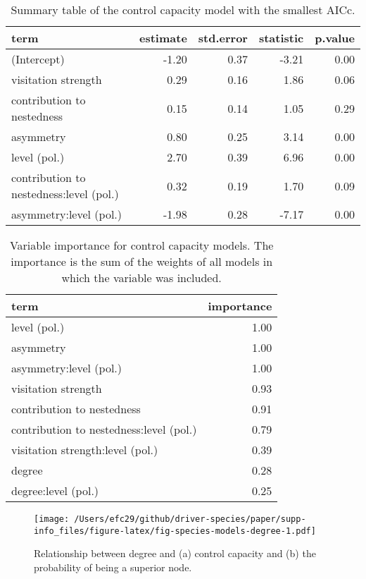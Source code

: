 \documentclass[a4paper]{artikel1}
\theoremstyle{definition}
\theoremstyle{definition}
\theoremstyle{definition}
\theoremstyle{remark}
\begin{document}
\begin{table}

\caption{\label{tab:tab-model-output-species-level}Summary table of the control capacity model with the smallest AICc.}
\centering
\fontsize{8}{10}\selectfont
\begin{tabular}[t]{lrrrr}
\toprule
term & estimate & std.error & statistic & p.value\\
\midrule
(Intercept) & -1.20 & 0.37 & -3.21 & 0.00\\
visitation strength & 0.29 & 0.16 & 1.86 & 0.06\\
contribution to nestedness & 0.15 & 0.14 & 1.05 & 0.29\\
asymmetry & 0.80 & 0.25 & 3.14 & 0.00\\
level (pol.) & 2.70 & 0.39 & 6.96 & 0.00\\
\addlinespace
contribution to nestedness:level (pol.) & 0.32 & 0.19 & 1.70 & 0.09\\
asymmetry:level (pol.) & -1.98 & 0.28 & -7.17 & 0.00\\
\bottomrule
\end{tabular}
\end{table}

\begin{table}

\caption{\label{tab:tab-var-importance}Variable importance for control capacity models. The importance is the sum of the weights of all models in which the variable was included.}
\centering
\fontsize{8}{10}\selectfont
\begin{tabular}[t]{lr}
\toprule
term & importance\\
\midrule
level (pol.) & 1.00\\
asymmetry & 1.00\\
asymmetry:level (pol.) & 1.00\\
visitation strength & 0.93\\
contribution to nestedness & 0.91\\
contribution to nestedness:level (pol.) & 0.79\\
visitation strength:level (pol.) & 0.39\\
degree & 0.28\\
degree:level (pol.) & 0.25\\
\bottomrule
\end{tabular}
\end{table}

\begin{figure}
\centering
\texttt{[image: /Users/efc29/github/driver-species/paper/supp-info\_files/figure-latex/fig-species-models-degree-1.pdf]}
\caption{\label{fig:fig-species-models-degree}Relationship between degree
and (a) control capacity and (b) the probability of being a superior
node.}
\end{figure}
\end{document}
